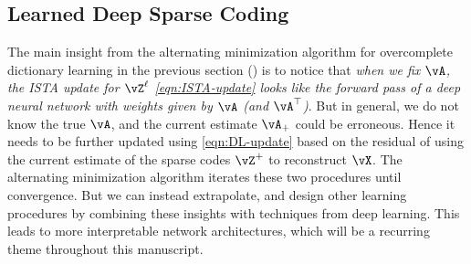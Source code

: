 \documentclass[../../book-main.tex]{subfiles}
\begin{document}
\subsection{Learned Deep Sparse Coding}
\label{sec:LISTA}
The main insight from the alternating minimization algorithm for
overcomplete dictionary learning in the previous section
() is to notice that \textit{when we
fix \(\vA\), the ISTA update for $\vZ^\ell$ \eqref{eqn:ISTA-update} looks like
the forward pass of a deep neural network with weights given by \(\vA\) (and
\(\vA^{\top}\))}. But in general, we do not know the true $\vA$, and the current
estimate $\vA_+$ could be erroneous. Hence it needs to be further updated using
\eqref{eqn:DL-update} based on the residual of using the current estimate of the
sparse codes $\vZ^+$ to reconstruct $\vX$. The alternating minimization
algorithm iterates these two procedures until convergence. But we can instead
extrapolate, and design other learning procedures by combining these insights
with techniques from deep learning. This leads to more interpretable network
architectures, which will be a recurring theme throughout this manuscript.
\end{document}
